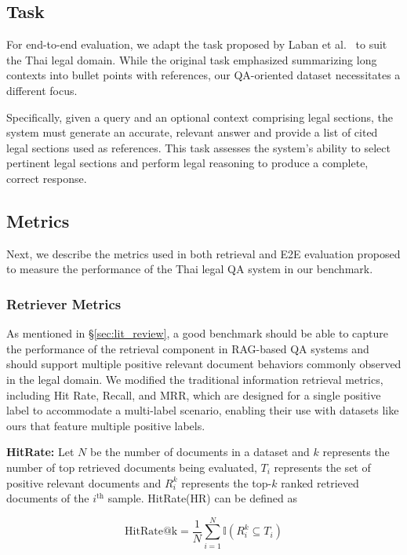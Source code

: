 \subsection{Task}
\label{subsec: task}

For end-to-end evaluation, we adapt the task proposed by Laban et al.~\cite{laban2024summaryhaystackchallengelongcontext} to suit the Thai legal domain.
%
While the original task emphasized summarizing long contexts into bullet points with references, our QA-oriented dataset necessitates a different focus. 

Specifically, given a query and an optional context comprising legal sections, the system must generate an accurate, relevant answer and provide a list of cited legal sections used as references. 
%
This task assesses the system’s ability to select pertinent legal sections and perform legal reasoning to produce a complete, correct response.

\subsection{Metrics}
\label{subsec: metric}
Next, we describe the metrics used in both retrieval and E2E evaluation proposed to measure the performance of the Thai legal QA system in our benchmark.

\subsubsection{Retriever Metrics}
\label{subsubsec: retriever_metric}
As mentioned in \S\ref{sec:lit_review}, a good benchmark should be able to capture the performance of the retrieval component in RAG-based QA systems and should support multiple positive relevant document behaviors commonly observed in the legal domain. 
%
We modified the traditional information retrieval metrics, including Hit Rate, Recall, and MRR, which are designed for a single positive label to accommodate a multi-label scenario, enabling their use with datasets like ours that feature multiple positive labels.

\textbf{HitRate:} Let $N$ be the number of documents in a dataset and $k$ represents the number of top retrieved documents being evaluated, $T_i$ represents the set of positive relevant documents and $R_i^k$ represents the top-$k$ ranked retrieved documents of the $i^\text{th}$ sample. 
%
HitRate(HR) can be defined as

\begin{equation}
    \text{HitRate@k}=\frac{1}{N}\sum_{i=1}^{N}\mathbb{I}(R_i^k\subseteq T_i) 
\end{equation}

